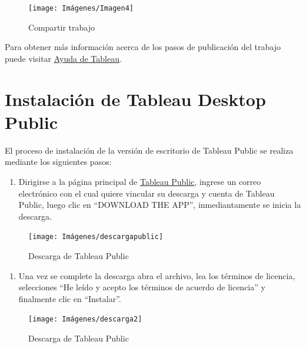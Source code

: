 \documentclass[
]{book}
\providecommand{\tightlist}{%
  \setlength{\itemsep}{0pt}\setlength{\parskip}{0pt}}
\begin{document}
\begin{figure}

{\centering \texttt{[image: Imágenes/Imagen4]} 

}

\caption{Compartir trabajo}\label{fig:compartir-fig}
\end{figure}

Para obtener más información acerca de los pasos de publicación del trabajo puede visitar \href{https://help.tableau.com/current/pro/desktop/en-us/save_savework.htm}{Ayuda de Tableau}.

\hypertarget{instalaciuxf3n-de-tableau-desktop-public}{%
\section{Instalación de Tableau Desktop Public}\label{instalaciuxf3n-de-tableau-desktop-public}}

El proceso de instalación de la versión de escritorio de Tableau Public se realiza mediante los siguientes pasos:

\begin{enumerate}
\def\labelenumi{\arabic{enumi}.}
\tightlist
\item
  Dirigirse a la página principal de \href{https://public.tableau.com/en-us/s/}{Tableau Public}, ingrese un correo electrónico con el cual quiere vincular su descarga y cuenta de Tableau Public, luego clic en ``DOWNLOAD THE APP'', inmediantamente se inicia la descarga.
\end{enumerate}

\begin{figure}

{\centering \texttt{[image: Imágenes/descargapublic]} 

}

\caption{Descarga de Tableau Public}\label{fig:descargapublic-fig}
\end{figure}

\begin{enumerate}
\def\labelenumi{\arabic{enumi}.}
\setcounter{enumi}{1}
\tightlist
\item
  Una vez se complete la descarga abra el archivo, lea los términos de licencia, selecciones ``He leído y acepto los términos de acuerdo de licencia'' y finalmente clic en ``Instalar''.
\end{enumerate}

\begin{figure}

{\centering \texttt{[image: Imágenes/descarga2]} 

}

\caption{Descarga de Tableau Public}\label{fig:descarga2-fig}
\end{figure}
\end{document}
